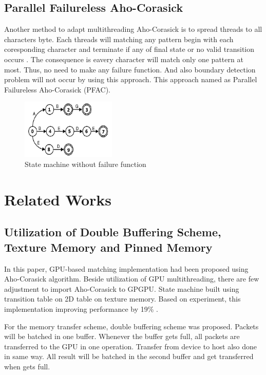 \documentclass[conference]{IEEEtran}
\begin{document}
    \subsection{Parallel Failureless Aho-Corasick}
    Another method to adapt multithreading Aho-Corasick is to spread threads to all characters byte. Each threads will matching any pattern begin with each coresponding character and terminate if any of final state or no valid transition occurs \cite{lin2013}. The consequence is eavery character will match only one pattern at most.
    Thus, no need to make any failure function. And also boundary detection problem will not occur by using this approach. This approach named as Parallel Failureless Aho-Corasick (PFAC).

    \begin{figure}[htbp]
        \centerline{\includegraphics[width=0.4\textwidth]{../src/resources/pfac.png}}
        \caption{State machine without failure function}
        \label{fig}
    \end{figure} 

\section{Related Works}

    \subsection{Utilization of Double Buffering Scheme, Texture Memory and Pinned Memory}

        In this paper, GPU-based matching implementation had been proposed using Aho-Corasick algorithm. Beside utilization of GPU multithreading, there are few adjustment to import Aho-Corasick to GPGPU. State machine built using transition table on 2D table on texture memory. Based on experiment, this implementation improving performance by 19\% \cite{gnort2008}.
        
        For the memory transfer scheme, double buffering scheme was proposed. Packets will be batched in one buffer. Whenever the buffer gets full, all packets are transferred to the GPU in one operation. Transfer from device to host also done in same way. All result will be batched in the second buffer and get transferred when gets full.
        
\end{document}
